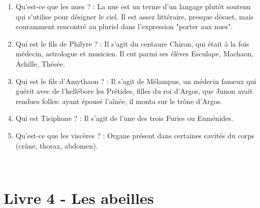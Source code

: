 \documentclass[a4paper, 11pt, hidelinks]{article}
\begin{document}
\begin{enumerate}
      \item Qu'est-ce que les nues ? : La nue est un terme d'un langage plutôt soutenu qui s'utilise pour désigner le ciel. Il est assez littéraire, presque désuet, mais couramment rencontré au pluriel dans l'expression "porter aux nues".
      \item Qui est le fils de Philyre ? : Il s'agit du centaure Chiron, qui était à la fois médecin, astrologue et musicien. Il eut parmi ses élèves
            Esculape, Machaon, Achille, Thésée.
      \item Qui est le fils d'Amythaon ? : Il s'agit de Mélampus, un médecin fameux qui guérit avec de l'hellébore les Prétides, filles du roi d'Argos, que Junon avait rendues folles: ayant épousé l'aînée, il monta sur le trône d'Argos.
      \item Qui est Tisiphone ? : Il s'agit de l'une des trois Furies ou Euménides.
      \item Qu'est-ce que les viscères ? : Organe présent dans certaines cavités du corps (crâne, thorax, abdomen).
\end{enumerate}



 \section{Livre 4 - Les abeilles}
\end{document}
